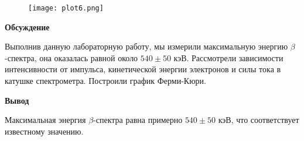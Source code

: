 \documentclass[12pt]{article}
\begin{document}
\begin{figure}[ht]
    \centering
    \texttt{[image: plot6.png]}
    \label{fig:plot6}
\end{figure}
\FloatBarrier
\newpage
\begin{center}
    \textbf{Обсуждение}
\end{center}
Выполнив данную лабораторную работу, мы измерили максимальную энергию
$\beta$-спектра, она оказалась равной около $540 \pm 50$ кэВ. Рассмотрели зависимости
интенсивности от импульса, кинетической энергии электронов и силы тока в катушке
спектрометра. Построили график Ферми-Кюри.
\begin{center}
    \textbf{Вывод}
\end{center}
Максимальная энергия $\beta$-спектра равна примерно $540 \pm 50$ кэВ, что
соответствует известному значению.
\end{document}
